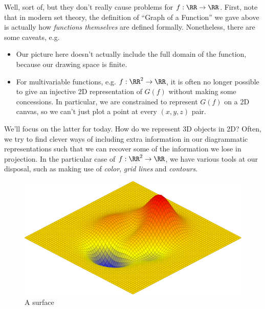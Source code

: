 Well, sort of, but they don't really cause problems for $f : \RR \to
\RR$. First, note that in modern set theory, the definition of ``Graph
of a Function'' we gave above is actually how \emph{functions
  themselves} are defined formally. Nonetheless, there are some
caveats, e.g.\
\begin{itemize}
  \item Our picture here doesn't actually include the full domain of
    the function, because our drawing space is finite.
  \item For multivariable functions, e.g. $f : \RR^2 \to \RR$, it is
    often no longer possible to give an injective 2D representation of
    $G(f)$ without making some concessions. In particular, we are
    constrained to represent $G(f)$ on a 2D canvas, so we can't just
    plot a point at every $(x,y,z)$ pair.
\end{itemize}
We'll focus on the latter for today. How do we represent 3D objects in
2D? Often, we try to find clever ways of including extra information
in our diagrammatic representations such that we can recover some of
the information we lose in projection. In the particular case of $f :
\RR^2 \to \RR$, we have various tools at our disposal, such as making
use of \emph{color}, \emph{grid lines} and
\emph{contours}.\\
\begin{minipage}{.49\linewidth}
  \begin{figure}[H]
    \centering
    \includegraphics[scale=.57]{figures/background/surface.pdf}
    \caption{A surface}
  \end{figure}
\end{minipage}
